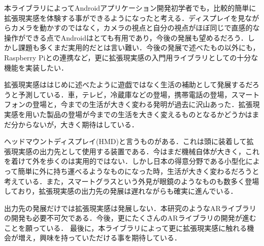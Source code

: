 本ライブラリによってAndroidアプリケーション開発初学者でも，比較的簡単に拡張現実感を体験する事ができるようになったと考える．ディスプレイを見ながらカメラを動かすのではなく，カメラの視点と自分の視点がほぼ同じで直感的な操作ができる点でAndroidはとても有用であり，今後の発展も望めるだろう．しかし課題も多くまだ実用的だとは言い難い．今後の発展で述べたもの以外にも，Raspberry Piとの連携など，更に拡張現実感の入門用ライブラリとしての十分な機能を実装したい．%

拡張現実感ははじめに述べたように遊戯ではなく生活の補助として発展するだろうと予測している．車，テレビ，冷蔵庫などの登場，携帯電話の登場，スマートフォンの登場と，今までの生活が大きく変わる発明が過去に沢山あった．拡張現実感を用いた製品の登場が今までの生活を大きく変えるものとなるかどうかはまだ分からないが，大きく期待はしている．

ヘッドマウントディスプレイ(HMD)と言うものがある．これは頭に装着して拡張現実感の出力先として使用する装置である．今はまだ機械自体が大きく，これを着けて外を歩くのは実用的ではない．しかし日本の得意分野である小型化によって簡単に外に持ち運べるようなものになった時，生活が大きく変わるだろうと考えている．また，スマートグラスという外見が眼鏡のようなものも数多く登場しており，拡張現実感の出力先の発展は遅れながらも確実に進んでいる．

出力先の発展だけでは拡張現実感は発展しない．本研究のようなARライブラリの開発も必要不可欠である．今後，更にたくさんのARライブラリの開発が進むことを願っている．
最後に，本ライブラリによって更に拡張現実感に触れる機会が増え，興味を持っていただける事を期待している．